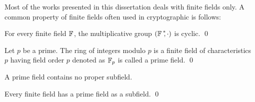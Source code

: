 Most of the works presented in this dissertation deals with  finite fields only. 
A common property of finite fields often used in cryptographic is follows:
\begin{theorem}\label{Cyclic Group in Finite Field}
	For every finite field ${\mathbb{F}}_{}$, the multiplicative group $({{\mathbb{F}}_{\,}}^{\ast}\!\!, \cdot)$ is cyclic. 
	\qed
\end{theorem}

\begin{definition}
	Let $p$ be a prime. The ring of integers modulo $p$ is  a finite field of characteristics $p$ having field order $p$ denoted as ${\mathbb{F}}_{p}$ is called a prime field.
	 \qed
\end{definition}
\begin{remark}
		A prime field contains no proper subfield.
\end{remark}

\begin{theorem}
	Every finite field has a prime field as a subfield. \qed
\end{theorem}


